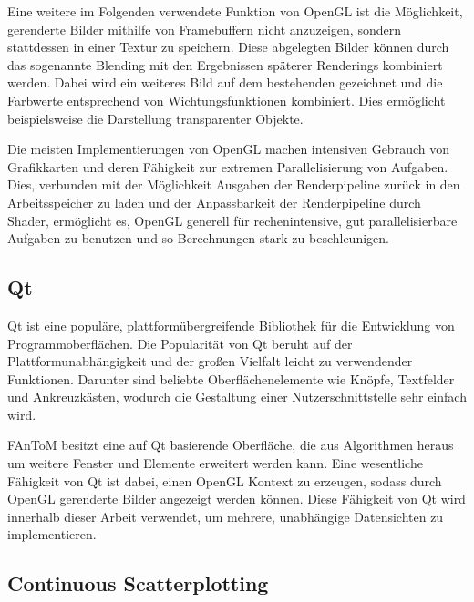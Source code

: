 \documentclass[a4paper,fontsize=12pt,toc=bib,parskip=half,ngerman]{scrartcl}
\begin{document}
Eine weitere im Folgenden verwendete Funktion von OpenGL ist die M\"oglichkeit, gerenderte Bilder mithilfe von \glq Framebuffern\grq{} nicht anzuzeigen, sondern stattdessen in einer Textur zu speichern. Diese abgelegten Bilder k\"onnen durch das sogenannte \glq Blending\grq{} mit den Ergebnissen sp\"aterer Renderings kombiniert werden. Dabei wird ein weiteres Bild auf dem bestehenden gezeichnet und die Farbwerte entsprechend von Wichtungsfunktionen kombiniert. Dies erm\"oglicht beispielsweise die Darstellung transparenter Objekte.

Die meisten Implementierungen von OpenGL machen intensiven Gebrauch von Grafikkarten und deren F\"ahigkeit zur extremen Parallelisierung von Aufgaben. Dies, verbunden mit der M\"oglichkeit Ausgaben der Renderpipeline zur\"uck in den Arbeitsspeicher zu laden und der Anpassbarkeit der Renderpipeline durch Shader, erm\"oglicht es, OpenGL generell f\"ur rechenintensive, gut parallelisierbare Aufgaben zu benutzen und so Berechnungen stark zu beschleunigen.

\subsection{Qt}
Qt\cite{qtWebsite} ist eine popul\"are, plattform\"ubergreifende Bibliothek f\"ur die Entwicklung von Programmoberfl\"achen. Die Popularit\"at von Qt beruht auf der Plattformunabh\"angigkeit und der gro{\ss}en Vielfalt leicht zu verwendender Funktionen. Darunter sind beliebte Oberfl\"achenelemente wie Kn\"opfe, Textfelder und Ankreuzk\"asten, wodurch die Gestaltung einer Nutzerschnittstelle sehr einfach wird.

FAnToM besitzt eine auf Qt basierende Oberfl\"ache, die aus Algorithmen heraus um weitere Fenster und Elemente erweitert werden kann. Eine wesentliche F\"ahigkeit von Qt ist dabei, einen OpenGL Kontext zu erzeugen, sodass durch OpenGL gerenderte Bilder angezeigt werden k\"onnen. Diese F\"ahigkeit von Qt wird innerhalb dieser Arbeit verwendet, um mehrere, unabh\"angige Datensichten zu implementieren. 

\subsection{Continuous Scatterplotting}
\end{document}
